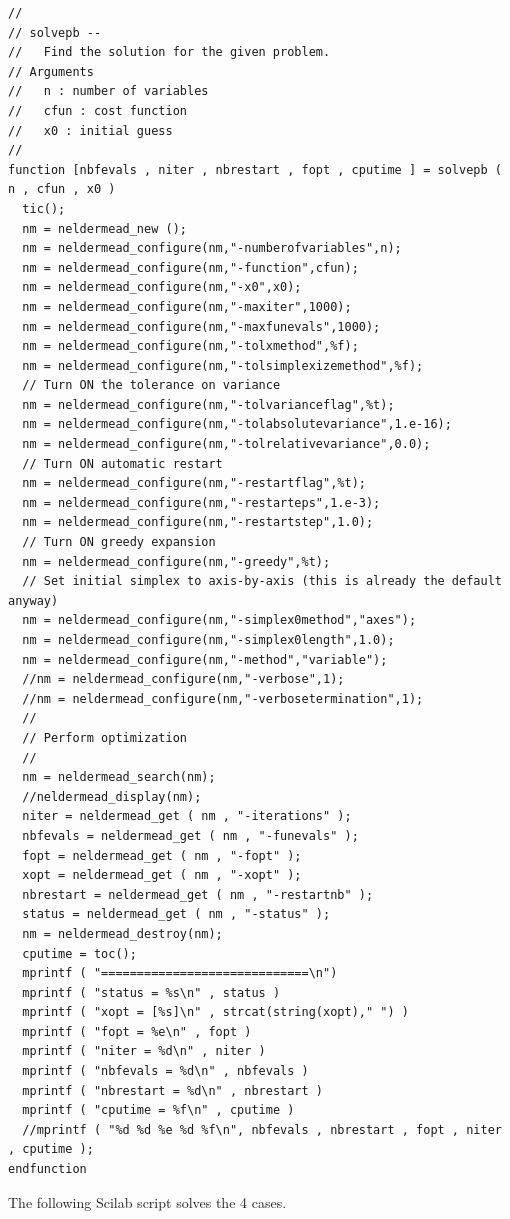 \lstset{language=scilabscript}
\begin{lstlisting}
//
// solvepb --
//   Find the solution for the given problem.
// Arguments
//   n : number of variables
//   cfun : cost function 
//   x0 : initial guess
//
function [nbfevals , niter , nbrestart , fopt , cputime ] = solvepb ( n , cfun , x0 )
  tic();
  nm = neldermead_new ();
  nm = neldermead_configure(nm,"-numberofvariables",n);
  nm = neldermead_configure(nm,"-function",cfun);
  nm = neldermead_configure(nm,"-x0",x0);
  nm = neldermead_configure(nm,"-maxiter",1000);
  nm = neldermead_configure(nm,"-maxfunevals",1000);
  nm = neldermead_configure(nm,"-tolxmethod",%f);
  nm = neldermead_configure(nm,"-tolsimplexizemethod",%f);
  // Turn ON the tolerance on variance
  nm = neldermead_configure(nm,"-tolvarianceflag",%t);
  nm = neldermead_configure(nm,"-tolabsolutevariance",1.e-16);
  nm = neldermead_configure(nm,"-tolrelativevariance",0.0);
  // Turn ON automatic restart
  nm = neldermead_configure(nm,"-restartflag",%t);
  nm = neldermead_configure(nm,"-restarteps",1.e-3);
  nm = neldermead_configure(nm,"-restartstep",1.0);
  // Turn ON greedy expansion
  nm = neldermead_configure(nm,"-greedy",%t);
  // Set initial simplex to axis-by-axis (this is already the default anyway)
  nm = neldermead_configure(nm,"-simplex0method","axes");
  nm = neldermead_configure(nm,"-simplex0length",1.0);
  nm = neldermead_configure(nm,"-method","variable");
  //nm = neldermead_configure(nm,"-verbose",1);
  //nm = neldermead_configure(nm,"-verbosetermination",1);
  //
  // Perform optimization
  //
  nm = neldermead_search(nm);
  //neldermead_display(nm);
  niter = neldermead_get ( nm , "-iterations" );
  nbfevals = neldermead_get ( nm , "-funevals" );
  fopt = neldermead_get ( nm , "-fopt" );
  xopt = neldermead_get ( nm , "-xopt" );
  nbrestart = neldermead_get ( nm , "-restartnb" );
  status = neldermead_get ( nm , "-status" );
  nm = neldermead_destroy(nm);
  cputime = toc();
  mprintf ( "=============================\n")
  mprintf ( "status = %s\n" , status )
  mprintf ( "xopt = [%s]\n" , strcat(string(xopt)," ") )
  mprintf ( "fopt = %e\n" , fopt )
  mprintf ( "niter = %d\n" , niter )
  mprintf ( "nbfevals = %d\n" , nbfevals )
  mprintf ( "nbrestart = %d\n" , nbrestart )
  mprintf ( "cputime = %f\n" , cputime )
  //mprintf ( "%d %d %e %d %f\n", nbfevals , nbrestart , fopt , niter , cputime );
endfunction
\end{lstlisting}

The following Scilab script solves the 4 cases.

